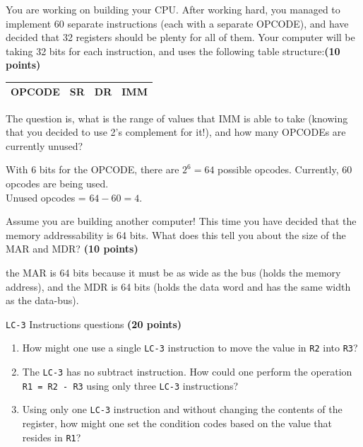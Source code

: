 \documentclass[10pt,answers]{exam}
\newcommand{\qpoints}[1]{\hfill \textbf{(#1 points)}}
\begin{document}
\begin{questions}

\question You are working on building your CPU. After working hard, you managed to implement 60 separate instructions (each with a separate OPCODE), and have decided that 32 registers should be plenty for all of them. Your computer will be taking 32 bits for each instruction, and uses the following table structure:\qpoints{10}

\begin{center}
\begin{tabular}{|l|l|l|l|}
\hline
OPCODE & SR & DR & IMM \\ \hline
\end{tabular}
\end{center}

The question is, what is the range of values that IMM is able to take (knowing that you decided to use 2's complement for it!), and how many OPCODEs are currently unused?

\begin{solution}
	With 6 bits for the OPCODE, there are $2^6 = 64$ possible opcodes. Currently, 60 opcodes are being used. \\  
	Unused opcodes = $64 - 60 = 4$.
	\end{solution}

\question Assume you are building another computer! This time you have decided that the memory addressability is 64 bits. What does this tell you about the size of the MAR and MDR? \qpoints{10}

\begin{solution}
    the MAR is 64 bits because it must be as wide as the bus (holds the memory address), and the MDR is 64 bits (holds the data word and has the same width as the data-bus).
\end{solution}

\newpage

\question \texttt{LC-3} Instructions questions \qpoints{20}
\begin{enumerate}[label=\alph*)]
    \item How might one use a single \texttt{LC-3} instruction to move the value in \texttt{R2} into \texttt{R3}?

    \item The \texttt{LC-3} has no subtract instruction. How could one perform the operation \texttt{R1 = R2 - R3} using only three \texttt{LC-3} instructions?

    \item Using only one \texttt{LC-3} instruction and without changing the contents of the register, how might one set the condition codes based on the value that resides in \texttt{R1}?


\end{enumerate}
\end{questions}
\end{document}
